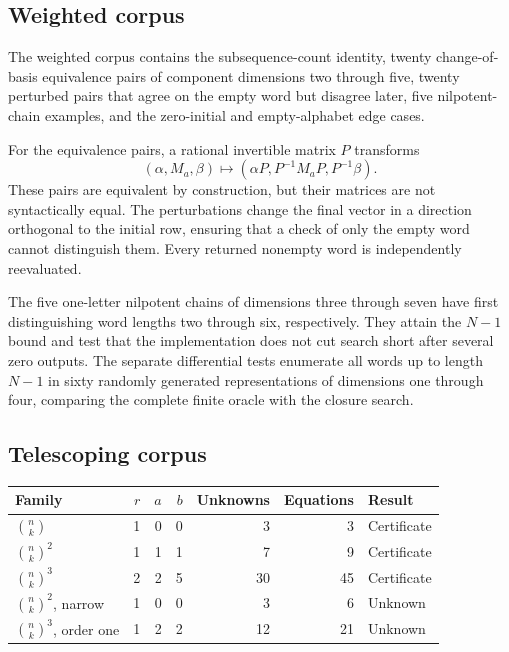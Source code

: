 \subsection{Weighted corpus}

The weighted corpus contains the subsequence-count identity, twenty
change-of-basis equivalence pairs of component dimensions two through five,
twenty perturbed pairs that agree on the empty word but disagree later, five
nilpotent-chain examples, and the zero-initial and empty-alphabet edge cases.

For the equivalence pairs, a rational invertible matrix $P$ transforms
\[
 (\alpha,M_a,\beta)\longmapsto
 (\alpha P,P^{-1}M_aP,P^{-1}\beta).
\]
These pairs are equivalent by construction, but their matrices are not
syntactically equal. The perturbations change the final vector in a direction
orthogonal to the initial row, ensuring that a check of only the empty word
cannot distinguish them. Every returned nonempty word is independently
reevaluated.

The five one-letter nilpotent chains of dimensions three through seven have
first distinguishing word lengths two through six, respectively. They attain
the $N-1$ bound and test that the implementation does not cut search short after
several zero outputs. The separate differential tests enumerate all words up
to length $N-1$ in sixty randomly generated representations of dimensions one
through four, comparing the complete finite oracle with the closure search.

\subsection{Telescoping corpus}

\begin{center}
\begin{tabular}{@{}lrrrrrl@{}}\toprule
Family & $r$ & $a$ & $b$ & Unknowns & Equations & Result \\
\midrule
$\binom nk$ & 1 & 0 & 0 & 3 & 3 & Certificate \\
$\binom nk^2$ & 1 & 1 & 1 & 7 & 9 & Certificate \\
$\binom nk^3$ & 2 & 2 & 5 & 30 & 45 & Certificate \\
$\binom nk^2$, narrow & 1 & 0 & 0 & 3 & 6 & Unknown \\
$\binom nk^3$, order one & 1 & 2 & 2 & 12 & 21 & Unknown \\
\bottomrule\end{tabular}
\end{center}

